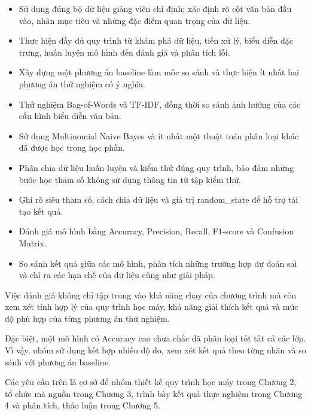 \begin{itemize}
    \item Sử dụng đúng bộ dữ liệu giảng viên chỉ định; xác định rõ cột văn bản đầu vào, nhãn mục tiêu và những đặc điểm quan trọng của dữ liệu.

    \item Thực hiện đầy đủ quy trình từ khám phá dữ liệu, tiền xử lý, biểu diễn đặc trưng, huấn luyện mô hình đến đánh giá và phân tích lỗi.

    \item Xây dựng một phương án baseline làm mốc so sánh và thực hiện ít nhất hai phương án thử nghiệm có ý nghĩa.

    \item Thử nghiệm Bag-of-Words và TF-IDF, đồng thời so sánh ảnh hưởng của các cấu hình biểu diễn văn bản.

    \item Sử dụng Multinomial Naive Bayes và ít nhất một thuật toán phân loại khác đã được học trong học phần.

    \item Phân chia dữ liệu huấn luyện và kiểm thử đúng quy trình, bảo đảm những bước học tham số không sử dụng thông tin từ tập kiểm thử.

    \item Ghi rõ siêu tham số, cách chia dữ liệu và giá trị random_state để hỗ trợ tái tạo kết quả.

    \item Đánh giá mô hình bằng Accuracy, Precision, Recall, F1-score và Confusion Matrix.

    \item So sánh kết quả giữa các mô hình, phân tích những trường hợp dự đoán sai và chỉ ra các hạn chế của dữ liệu cũng như giải pháp.
\end{itemize}

Việc đánh giá không chỉ tập trung vào khả năng chạy của chương trình mà còn xem xét tính hợp lý của quy trình học máy, khả năng giải thích kết quả và mức độ phù hợp của từng phương án thử nghiệm.

Đặc biệt, một mô hình có Accuracy cao chưa chắc đã phân loại tốt tất cả các lớp. Vì vậy, nhóm sử dụng kết hợp nhiều độ đo, xem xét kết quả theo từng nhãn và so sánh với phương án baseline.

Các yêu cầu trên là cơ sở để nhóm thiết kế quy trình học máy trong Chương 2, tổ chức mã nguồn trong Chương 3, trình bày kết quả thực nghiệm trong Chương 4 và phân tích, thảo luận trong Chương 5.
